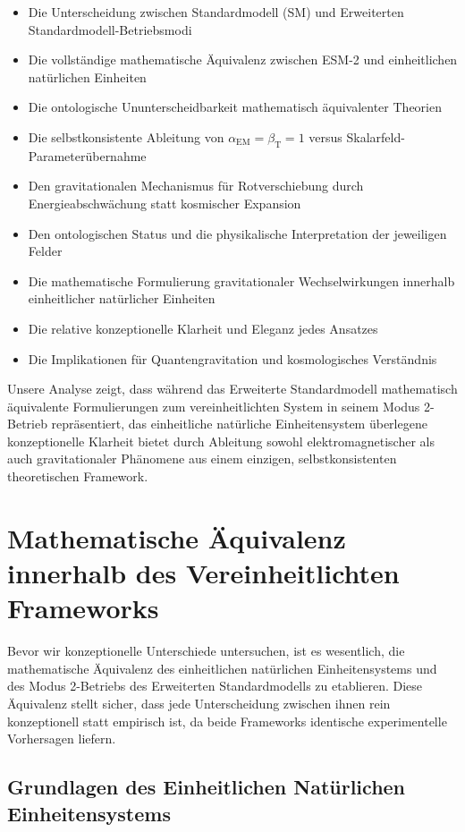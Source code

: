 \documentclass[12pt,a4paper]{article}
\newcommand{\alphaEM}{\alpha_{\text{EM}}}
\newcommand{\betaT}{\beta_{\text{T}}}
\begin{document}
	\begin{itemize}
		\item Die Unterscheidung zwischen Standardmodell (SM) und Erweiterten Standardmodell-Betriebsmodi
		\item Die vollständige mathematische Äquivalenz zwischen ESM-2 und einheitlichen natürlichen Einheiten
		\item Die ontologische Ununterscheidbarkeit mathematisch äquivalenter Theorien
		\item Die selbstkonsistente Ableitung von $\alphaEM = \betaT = 1$ versus Skalarfeld-Parameterübernahme
		\item Den gravitationalen Mechanismus für Rotverschiebung durch Energieabschwächung statt kosmischer Expansion
		\item Den ontologischen Status und die physikalische Interpretation der jeweiligen Felder
		\item Die mathematische Formulierung gravitationaler Wechselwirkungen innerhalb einheitlicher natürlicher Einheiten
		\item Die relative konzeptionelle Klarheit und Eleganz jedes Ansatzes
		\item Die Implikationen für Quantengravitation und kosmologisches Verständnis
	\end{itemize}
	
	Unsere Analyse zeigt, dass während das Erweiterte Standardmodell mathematisch äquivalente Formulierungen zum vereinheitlichten System in seinem Modus 2-Betrieb repräsentiert, das einheitliche natürliche Einheitensystem überlegene konzeptionelle Klarheit bietet durch Ableitung sowohl elektromagnetischer als auch gravitationaler Phänomene aus einem einzigen, selbstkonsistenten theoretischen Framework.
	
	\section{Mathematische Äquivalenz innerhalb des Vereinheitlichten Frameworks}
	\label{sec:mathematical_equivalence}
	
	Bevor wir konzeptionelle Unterschiede untersuchen, ist es wesentlich, die mathematische Äquivalenz des einheitlichen natürlichen Einheitensystems und des Modus 2-Betriebs des Erweiterten Standardmodells zu etablieren. Diese Äquivalenz stellt sicher, dass jede Unterscheidung zwischen ihnen rein konzeptionell statt empirisch ist, da beide Frameworks identische experimentelle Vorhersagen liefern.
	
	\subsection{Grundlagen des Einheitlichen Natürlichen Einheitensystems}
	\label{subsec:unified_foundation}
	
\end{document}
